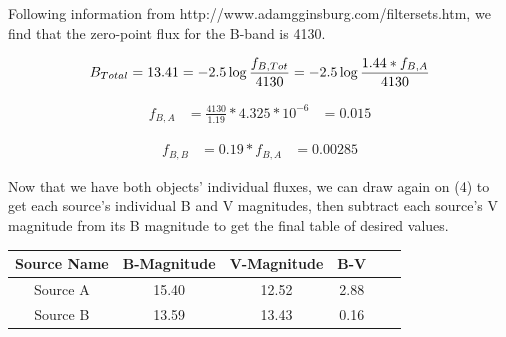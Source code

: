 \documentclass[12pt]{article}
\newenvironment{answer}[2][Answer]{\begin{trivlist}
\item[\hskip \labelsep {\bfseries #1}\hskip \labelsep {\bfseries #2.}]}{\end{trivlist}}
\begin{document}
\begin{answer}{2}
  Following information from http://www.adamgginsburg.com/filtersets.htm, we find that the zero-point flux for the B-band is 4130.

  $$ B_{Total} = 13.41 = -2.5 \log{\frac{f_{B,Tot}}{4130}} \\
              = -2.5 \log{\frac{1.44 * f_{B,A}}{4130}}  $$

  \begin{equation}
    \begin{align}
    f_{B,A} & = \frac{4130}{1.19} * 4.325 * 10^{-6}
            & = 0.015
    \end{align}
  \end{equation}

  \begin{equation}
    \begin{align}
      f_{B,B} & = 0.19 * f_{B,A}
              & = 0.00285
    \end{align}
  \end{equation}


  Now that we have both objects' individual fluxes, we can draw again on (4) to get each source's individual B and V magnitudes, then subtract each source's V magnitude from its B magnitude to get the final table of desired values.


  \bigskip
  \bigskip

  \centering
  \begin{tabular} {cccccc}
  Source Name & B-Magnitude     & V-Magnitude   & B-V   \\
  \hline
  \hline
  Source A    & 15.40           & 12.52         & 2.88 \\
  Source B    & 13.59           & 13.43         & 0.16  \\
  \hline

  \end{tabular}

\end{answer}


\bigskip
\bigskip
\end{document}
